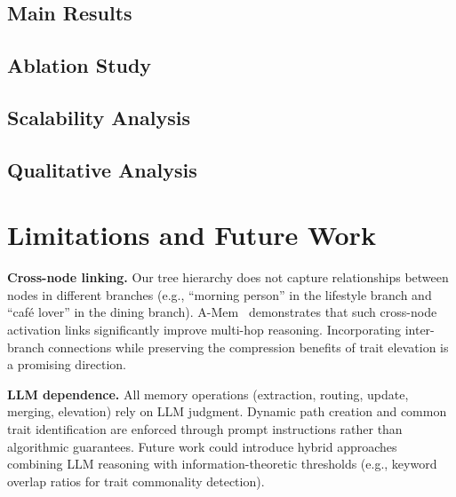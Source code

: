 \documentclass[manuscript,screen,review]{acmart}
\begin{document}
\subsection{Main Results}


\subsection{Ablation Study}


\subsection{Scalability Analysis}


\subsection{Qualitative Analysis}



\section{Limitations and Future Work}

\textbf{Cross-node linking.}
Our tree hierarchy does not capture relationships between nodes in different branches (e.g., ``morning person'' in the lifestyle branch and ``caf\'{e} lover'' in the dining branch). A-Mem~\cite{amem} demonstrates that such cross-node activation links significantly improve multi-hop reasoning. Incorporating inter-branch connections while preserving the compression benefits of trait elevation is a promising direction.

\textbf{LLM dependence.}
All memory operations (extraction, routing, update, merging, elevation) rely on LLM judgment. Dynamic path creation and common trait identification are enforced through prompt instructions rather than algorithmic guarantees. Future work could introduce hybrid approaches combining LLM reasoning with information-theoretic thresholds (e.g., keyword overlap ratios for trait commonality detection).
\end{document}
